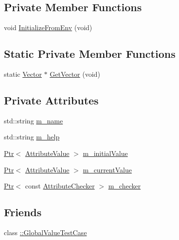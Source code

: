 \subsection*{Private Member Functions}
\begin{DoxyCompactItemize}
\item 
void \hyperlink{classns3_1_1GlobalValue_a3331178fe3b1bec1f8109583045dcdab}{Initialize\+From\+Env} (void)
\end{DoxyCompactItemize}
\subsection*{Static Private Member Functions}
\begin{DoxyCompactItemize}
\item 
static \hyperlink{classns3_1_1GlobalValue_a674b6c1d387dc3b62e416c7fff43a4e9}{Vector} $\ast$ \hyperlink{classns3_1_1GlobalValue_a69fde3a69c812df719c42b4e2ebde77e}{Get\+Vector} (void)
\end{DoxyCompactItemize}
\subsection*{Private Attributes}
\begin{DoxyCompactItemize}
\item 
std\+::string \hyperlink{classns3_1_1GlobalValue_aee127b09561e9714565260194dbec3ad}{m\+\_\+name}
\item 
std\+::string \hyperlink{classns3_1_1GlobalValue_a8f1879be6f6eb27f9efc4599eb7d6b58}{m\+\_\+help}
\item 
\hyperlink{classns3_1_1Ptr}{Ptr}$<$ \hyperlink{classns3_1_1AttributeValue}{Attribute\+Value} $>$ \hyperlink{classns3_1_1GlobalValue_ad7963fb567f993a0a14bd8ff87553d11}{m\+\_\+initial\+Value}
\item 
\hyperlink{classns3_1_1Ptr}{Ptr}$<$ \hyperlink{classns3_1_1AttributeValue}{Attribute\+Value} $>$ \hyperlink{classns3_1_1GlobalValue_ac1b6a8c1ae676b1733a5d0c23415e293}{m\+\_\+current\+Value}
\item 
\hyperlink{classns3_1_1Ptr}{Ptr}$<$ const \hyperlink{classns3_1_1AttributeChecker}{Attribute\+Checker} $>$ \hyperlink{classns3_1_1GlobalValue_aa39ac6dc36430f492a9d25b1d1a7776a}{m\+\_\+checker}
\end{DoxyCompactItemize}
\subsection*{Friends}
\begin{DoxyCompactItemize}
\item 
class \hyperlink{classns3_1_1GlobalValue_a0bf24f1ac3f65d68f23db505c74e9a15}{\+::\+Global\+Value\+Test\+Case}
\end{DoxyCompactItemize}


